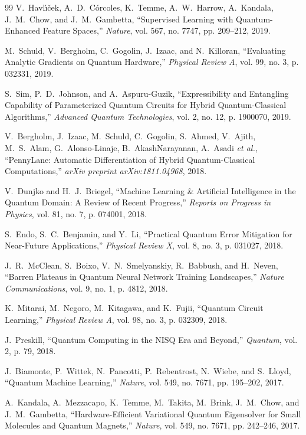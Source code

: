 \documentclass[pdflatex,sn-mathphys-num]{sn-jnl}%
\theoremstyle{thmstyleone}%
\theoremstyle{thmstyletwo}%
\theoremstyle{thmstylethree}%
\begin{document}
\begin{thebibliography}{99}
V.~Havl{\'\i}{\v{c}}ek, A.~D.~C{\'o}rcoles, K.~Temme,
A.~W.~Harrow, A.~Kandala, J.~M.~Chow, and J.~M.~Gambetta,
``Supervised Learning with Quantum-Enhanced Feature Spaces,''
\emph{Nature}, vol. 567, no. 7747,
pp. 209--212, 2019.

M.~Schuld, V.~Bergholm, C.~Gogolin, J.~Izaac,
and N.~Killoran,
``Evaluating Analytic Gradients on Quantum Hardware,''
\emph{Physical Review A}, vol. 99, no. 3,
p. 032331, 2019.

S.~Sim, P.~D.~Johnson, and A.~Aspuru-Guzik,
``Expressibility and Entangling Capability of Parameterized Quantum Circuits for Hybrid Quantum-Classical Algorithms,''
\emph{Advanced Quantum Technologies}, vol. 2, no. 12,
p. 1900070, 2019.

V.~Bergholm, J.~Izaac, M.~Schuld, C.~Gogolin, S.~Ahmed,
V.~Ajith, M.~S.~Alam, G.~Alonso-Linaje,
B.~AkashNarayanan, A.~Asadi \emph{et al.},
``PennyLane: Automatic Differentiation of Hybrid Quantum-Classical Computations,''
\emph{arXiv preprint arXiv:1811.04968}, 2018.

V.~Dunjko and H.~J.~Briegel,
``Machine Learning \& Artificial Intelligence in the Quantum Domain:
A Review of Recent Progress,''
\emph{Reports on Progress in Physics}, vol. 81, no. 7,
p. 074001, 2018.

S.~Endo, S.~C.~Benjamin, and Y.~Li,
``Practical Quantum Error Mitigation for Near-Future Applications,''
\emph{Physical Review X}, vol. 8, no. 3,
p. 031027, 2018.

J.~R.~McClean, S.~Boixo, V.~N.~Smelyanskiy,
R.~Babbush, and H.~Neven,
``Barren Plateaus in Quantum Neural Network Training Landscapes,''
\emph{Nature Communications}, vol. 9, no. 1,
p. 4812, 2018.

K.~Mitarai, M.~Negoro, M.~Kitagawa, and K.~Fujii,
``Quantum Circuit Learning,''
\emph{Physical Review A}, vol. 98, no. 3,
p. 032309, 2018.

J.~Preskill,
``Quantum Computing in the NISQ Era and Beyond,''
\emph{Quantum}, vol. 2, p. 79, 2018.

J.~Biamonte, P.~Wittek, N.~Pancotti, P.~Rebentrost,
N.~Wiebe, and S.~Lloyd,
``Quantum Machine Learning,''
\emph{Nature}, vol. 549, no. 7671,
pp. 195--202, 2017.

A.~Kandala, A.~Mezzacapo, K.~Temme, M.~Takita,
M.~Brink, J.~M.~Chow, and J.~M.~Gambetta,
``Hardware-Efficient Variational Quantum Eigensolver for Small Molecules and Quantum Magnets,''
\emph{Nature}, vol. 549, no. 7671,
pp. 242--246, 2017.


\end{thebibliography}
\end{document}
